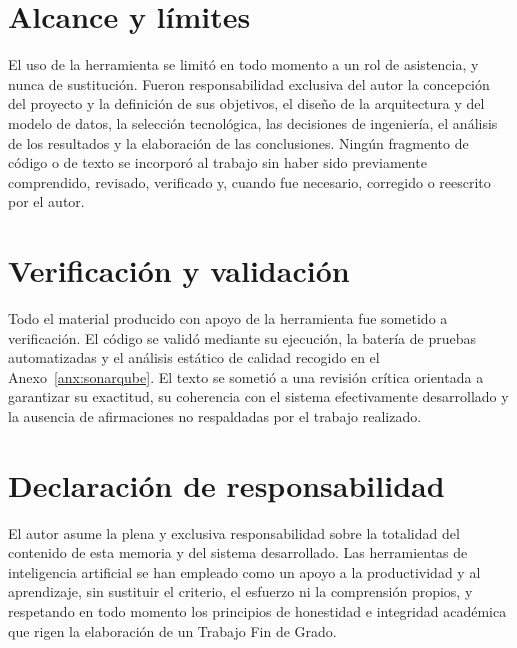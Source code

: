\section*{Alcance y límites}

El uso de la herramienta se limitó en todo momento a un rol de asistencia, y
nunca de sustitución.  Fueron responsabilidad exclusiva del autor la concepción
del proyecto y la definición de sus objetivos, el diseño de la arquitectura y
del modelo de datos, la selección tecnológica, las decisiones de ingeniería, el
análisis de los resultados y la elaboración de las conclusiones.  Ningún
fragmento de código o de texto se incorporó al trabajo sin haber sido
previamente comprendido, revisado, verificado y, cuando fue necesario, corregido
o reescrito por el autor.

\section*{Verificación y validación}

Todo el material producido con apoyo de la herramienta fue sometido a
verificación.  El código se validó mediante su ejecución, la batería de pruebas
automatizadas y el análisis estático de calidad recogido en el
Anexo~\ref{anx:sonarqube}.  El texto se sometió a una revisión crítica orientada
a garantizar su exactitud, su coherencia con el sistema efectivamente
desarrollado y la ausencia de afirmaciones no respaldadas por el trabajo
realizado.

\section*{Declaración de responsabilidad}

El autor asume la plena y exclusiva responsabilidad sobre la totalidad del
contenido de esta memoria y del sistema desarrollado.  Las herramientas de
inteligencia artificial se han empleado como un apoyo a la productividad y al
aprendizaje, sin sustituir el criterio, el esfuerzo ni la comprensión propios, y
respetando en todo momento los principios de honestidad e integridad académica
que rigen la elaboración de un Trabajo Fin de Grado.


